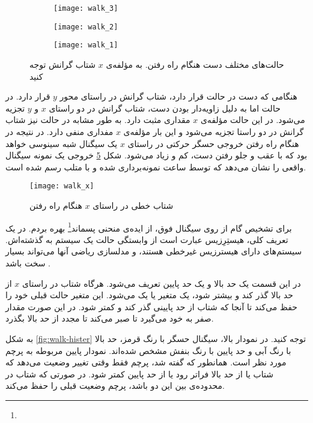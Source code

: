 \begin{figure}[h]
	\centering
	\begin{subfigure}{0.32\textwidth}
		\centering
		\texttt{[image: walk\_3]}
		\caption{}
		\label{fig:walk-3}
	\end{subfigure}
	\begin{subfigure}{0.3\textwidth}
		\centering
		\texttt{[image: walk\_2]}
		\caption{}
		\label{fig:walk-2}
	\end{subfigure}
	\begin{subfigure}{0.3\textwidth}
		\centering
		\texttt{[image: walk\_1]}
		\caption{}
		\label{fig:walk-1}
	\end{subfigure}
	\caption{حالت‌های مختلف دست هنگام راه رفتن. به مؤلفه‌ی $x$ شتاب گرانش توجه کنید}
	\label{fig:walk}
\end{figure}
\newpage
هنگامی که دست در حالت  قرار دارد، شتاب گرانش در راستای محور $y$ قرار دارد. در حالت  اما به دلیل زاویه‌دار بودن دست، شتاب گرانش در دو راستای $x$ و $y$ تجزیه می‌شود. در این حالت مؤلفه‌ی $x$ مقداری مثبت دارد. به طور مشابه در حالت  نیز شتاب گرانش در دو راستا تجزیه می‌شود و این بار مؤلفه‌ی $x$ مفداری منفی دارد. در نتیجه در هنگام راه رفتن خروجی حسگر حرکتی در راستای $x$ یک سیگنال شبه سینوسی خواهد بود که با عقب و جلو رفتن دست، کم و زیاد می‌شود. شکل \ref{fig:walk-x} خروجی یک نمونه سیگنال واقعی را نشان می‌دهد که توسط ساعت نمونه‌برداری شده و با متلب رسم شده است.

\begin{figure}[h]
	\centering
	\texttt{[image: walk\_x]}
	\caption{شتاب خطی در راستای $x$ هنگام راه رفتن}
	\label{fig:walk-x}
\end{figure}

برای تشخیص گام از روی سیگنال فوق، از ایده‌ی منحنی پسماند\footnote{} بهره بردم. در یک تعریف کلی، هیستِرِزیس عبارت است از وابستگی حالت یک سیستم به گذشته‌اش. سیستم‌های دارای هیسترزیس غیرخطی هستند، و مدلسازی ریاضی آنها می‌تواند بسیار سخت باشد \cite{hister}.

در این قسمت یک حد بالا و یک حد پایین تعریف می‌شود. هرگاه شتاب در راستای $x$ از حد بالا گذر کند و بیشتر شود، یک متغیر یا  یک می‌شود. این متغیر حالت قبلی خود را حفظ می‌کند تا آنجا که شتاب از حد پایینی گذر کند و کمتر شود. در این صورت مقدار صفر به خود می‌گیرد تا صبر می‌کند تا مجدد از حد بالا بگذرد.

به شکل \ref{fig:walk-hister} توجه کنید. در نمودار بالا، سیگنال حسگر با رنگ قرمز، حد بالا با رنگ آبی و حد پایین با رنگ بنفش مشخص شده‌اند. نمودار پایین مربوطه به پرچم مورد نظر است. همانطور که گفته شد، پرچم فقط وقتی تغییر وضعیت می‌دهد که شتاب یا از حد بالا فراتر رود یا از حد پایین کمتر شود. در صورتی که شتاب در محدوده‌ی بین این دو باشد، پرچم وضعیت قبلی را حفظ می‌کند.

